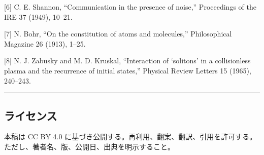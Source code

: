 \documentclass[
]{ltjsarticle}
\begin{document}
{[}6{]} C. E. Shannon, ``Communication in the presence of noise,''
Proceedings of the IRE 37 (1949), 10--21.

{[}7{]} N. Bohr, ``On the constitution of atoms and molecules,''
Philosophical Magazine 26 (1913), 1--25.

{[}8{]} N. J. Zabusky and M. D. Kruskal, ``Interaction of `solitons' in
a collisionless plasma and the recurrence of initial states,'' Physical
Review Letters 15 (1965), 240--243.

\begin{center}\rule{0.5\linewidth}{0.5pt}\end{center}

\subsection{ライセンス}\label{ux30e9ux30a4ux30bbux30f3ux30b9}

本稿は CC BY 4.0
に基づき公開する。再利用、翻案、翻訳、引用を許可する。ただし、著者名、版、公開日、出典を明示すること。
\end{document}
